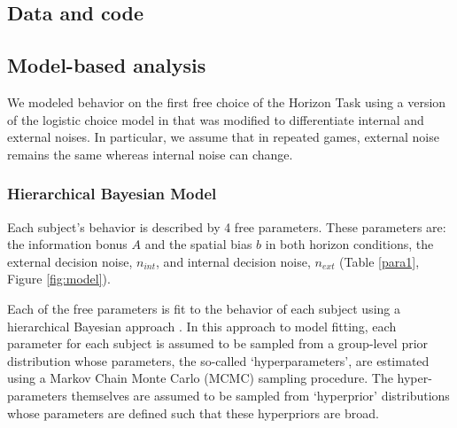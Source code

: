 \documentclass[12pt]{article}
\begin{document}
	
	\subsection*{Data and code}
	
	
	\subsection*{Model-based analysis}
	We modeled behavior on the first free choice of the Horizon Task using a version of the logistic choice model in \citep{wilson2014} that was modified to differentiate internal and external noises. In particular, we assume that in repeated games, external noise remains the same whereas internal noise can change. 
	\subsubsection*{Hierarchical Bayesian Model}
	Each subject's behavior is described by 4 free parameters. These parameters are: the information bonus $A$ and the spatial bias $b$ in both horizon conditions, the external decision noise, $n_{int}$, and internal decision noise, $n_{ext}$ (Table \ref{para1}, Figure \ref{fig:model}). 
	
	Each of the free parameters is fit to the behavior of each subject using a hierarchical Bayesian approach \citep{hbm1}.  In this approach to model fitting, each parameter for each subject is assumed to be sampled from a group-level prior distribution whose parameters, the so-called `hyperparameters', are estimated using a Markov Chain Monte Carlo (MCMC) sampling procedure. The hyper-parameters themselves are assumed to be sampled from `hyperprior' distributions whose parameters are defined such that these hyperpriors are broad.  
	
\end{document}
